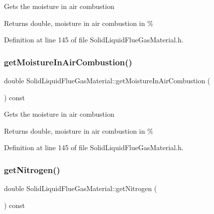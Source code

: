 Gets the moisture in air combustion \begin{DoxyReturn}{Returns}
double, moisture in air combustion in \% 
\end{DoxyReturn}


Definition at line 145 of file Solid\+Liquid\+Flue\+Gas\+Material.\+h.

\mbox{\label{class_solid_liquid_flue_gas_material_ae3d9780851b8217ed2885753f11ec18b}} 
\subsubsection{\texorpdfstring{get\+Moisture\+In\+Air\+Combustion()}{getMoistureInAirCombustion()}\hspace{0.1cm}{\footnotesize\ttfamily [3/3]}}
{\footnotesize\ttfamily double Solid\+Liquid\+Flue\+Gas\+Material\+::get\+Moisture\+In\+Air\+Combustion (\begin{DoxyParamCaption}{ }\end{DoxyParamCaption}) const\hspace{0.3cm}{\ttfamily [inline]}}

Gets the moisture in air combustion \begin{DoxyReturn}{Returns}
double, moisture in air combustion in \% 
\end{DoxyReturn}


Definition at line 145 of file Solid\+Liquid\+Flue\+Gas\+Material.\+h.

\mbox{\label{class_solid_liquid_flue_gas_material_a76159a5d9d609f0e0131f7bca3b60ebc}} 
\subsubsection{\texorpdfstring{get\+Nitrogen()}{getNitrogen()}\hspace{0.1cm}{\footnotesize\ttfamily [1/3]}}
{\footnotesize\ttfamily double Solid\+Liquid\+Flue\+Gas\+Material\+::get\+Nitrogen (\begin{DoxyParamCaption}{ }\end{DoxyParamCaption}) const\hspace{0.3cm}{\ttfamily [inline]}}


